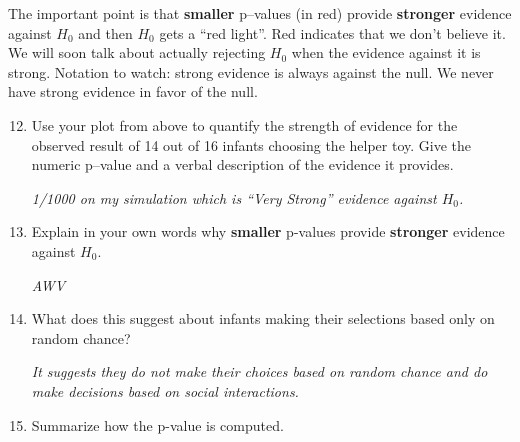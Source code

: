   The important point is that {\bf smaller} p--values (in red) provide {\bf
    stronger} evidence against $H_0$ and then $H_0$ gets a ``red
  light''. Red indicates that we don't believe it.  We will soon talk
  about actually rejecting $H_0$ when the evidence against it is
  strong.  Notation to watch:  strong evidence is always against the
  null. We never have strong evidence in favor of the null.  



\begin{enumerate}
  \setcounter{enumi}{11}

    \item  Use your plot from above to quantify the strength of
      evidence for the observed result 
      of 14 out of 16 infants choosing the helper toy. Give the
      numeric p--value  and a verbal description of the evidence it provides.
\begin{students}
  \vspace{1.5cm}
\end{students}

\begin{key}
{\it  1/1000 on my simulation which is ``Very Strong'' evidence
  against $H_0$.}
\end{key}

\item Explain in your own words why {\bf smaller} p-values provide
  {\bf stronger}   evidence against $H_0$.
\begin{students}
  \vspace{2cm}
\end{students}

\begin{key}
{\it AWV}
\end{key}

\item  What does this suggest about infants making their
      selections based only on random chance?
\begin{students}
  \vspace{2cm}
\end{students}

\begin{key}
{\it It suggests they do not make their choices based on random
 chance and do make decisions based on social interactions. }
\end{key}
\item Summarize how the p-value is computed.
\begin{students}
  \vspace{2cm}
\end{students}


\end{enumerate}
